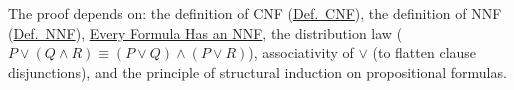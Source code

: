 \begin{remark*}[Dependencies]
The proof depends on: the definition of CNF (\hyperref[def:cnf]{Def.\ CNF}),
the definition of NNF (\hyperref[def:nnf]{Def.\ NNF}),
\hyperref[prop:nnf-exists]{Every Formula Has an NNF},
the distribution law ($P \vee (Q \wedge R) \equiv (P \vee Q) \wedge (P \vee
R)$), associativity of $\vee$ (to flatten clause disjunctions), and the
principle of structural induction on propositional formulas.
\end{remark*}
